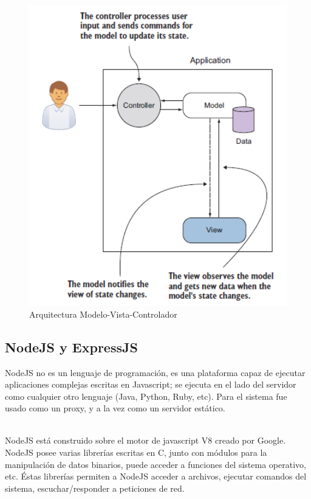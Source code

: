 			\begin{figure}[H]
			    \centering
				\includegraphics[width=16cm]{../imgs/ejemplos/mvc.png}
				\caption{Arquitectura Modelo-Vista-Controlador}
				\label{figure:mvc}
			\end{figure}
			
		
	\subsection{NodeJS y ExpressJS}
		NodeJS no es un lenguaje de programación, es una plataforma capaz de ejecutar
		aplicaciones complejas escritas en Javascript; se ejecuta en el lado del
		servidor como cualquier otro lenguaje (Java, Python, Ruby, etc).
		Para el sistema fue usado como un proxy, y a la vez como un servidor estático.\\\
		
		NodeJS está construido sobre el motor de javascript V8 creado por Google.
		NodeJS posee varias librerías escritas en C, junto con módulos para la
		manipulación de datos binarios, puede acceder a funciones del sistema
		operativo, etc. Éstas librerías permiten a NodeJS acceder a archivos, ejecutar
		comandos del sistema, escuchar/responder a peticiones de red.\\\
		
